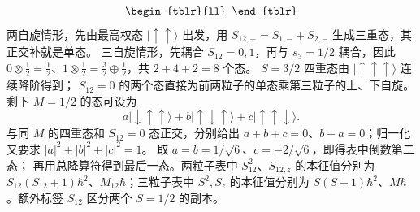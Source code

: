 \begin{enumerate}
{\begin{enumerate}
\[\begin{tblr}{ll}
\end{tblr}	
	 \]
两自旋情形，先由最高权态 $|\uparrow\uparrow\rangle$ 出发，用
$S_{12,-}=S_{1,-}+S_{2,-}$ 生成三重态，其正交补就是单态。
三自旋情形，先耦合 $S_{12}=0,1$，再与 $s_3=1/2$ 耦合，因此
$0\otimes\tfrac12=\tfrac12$、$1\otimes\tfrac12=\tfrac32\oplus\tfrac12$，共 $2+4+2=8$ 个态。
$S=3/2$ 四重态由 $|\uparrow\uparrow\uparrow\rangle$ 连续降阶得到；
$S_{12}=0$ 的两个态直接为前两粒子的单态乘第三粒子的上、下自旋。
剩下 $M=1/2$ 的态可设为
\[
 a|\downarrow\uparrow\uparrow\rangle
 +b|\uparrow\downarrow\uparrow\rangle
 +c|\uparrow\uparrow\downarrow\rangle.
\]
与同 $M$ 的四重态和 $S_{12}=0$ 态正交，分别给出
$a+b+c=0$、$b-a=0$；归一化又要求 $|a|^2+|b|^2+|c|^2=1$。
取 $a=b=1/\sqrt6$、$c=-2/\sqrt6$，即得表中倒数第二态；
再用总降算符得到最后一态。两粒子表中 $S_{12}^2$、$S_{12,z}$ 的本征值分别为
$S_{12}(S_{12}+1)\hbar^2$、$M_{12}\hbar$；三粒子表中 $S^2,S_z$ 的本征值分别为
$S(S+1)\hbar^2$、$M\hbar$。额外标签 $S_{12}$ 区分两个 $S=1/2$ 的副本。
\end{enumerate}
}

	
 \end{enumerate}

 
